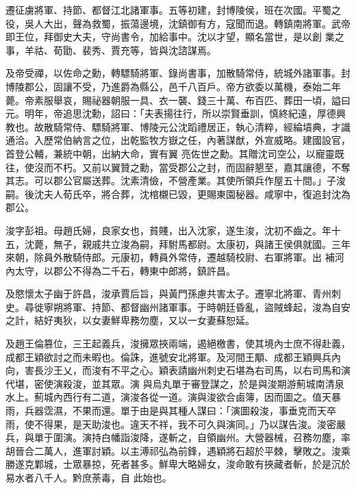 \begin{pinyinscope}
 遷征虜將軍、持節、都督江北諸軍事。五等初建，封博陵侯，班在次國。平蜀之役，吳人大出，聲為救蜀，振蕩邊境，沈鎮御有方，寇聞而退。轉鎮南將軍。武帝即王位，拜御史大夫，守尚書令，加給事中。沈以才望，顯名當世，是以創
 業之事，羊祜、荀勖、裴秀、賈充等，皆與沈諮謀焉。



 及帝受禪，以佐命之勳，轉驃騎將軍、錄尚書事，加散騎常侍，統城外諸軍事。封博陵郡公，固讓不受，乃進爵為縣公，邑千八百戶。帝方欲委以萬機，泰始二年薨。帝素服舉哀，賜祕器朝服一具、衣一襲、錢三十萬、布百匹、葬田一頃，謚曰元。明年，帝追思沈勳，詔曰：「夫表揚往行，所以崇賢垂訓，慎終紀遠，厚德興教也。故散騎常侍、驃騎將軍、博陵元公沈蹈禮居正，執心清粹，經綸墳典，才識通洽。入歷常伯納言之位，出乾監牧方嶽之任，內著謀猷，外宣威略。建國設官，首登公輔，兼統中朝，出納大命，實有翼
 亮佐世之勳。其贈沈司空公，以寵靈既往，使沒而不朽。又前以翼贊之勳，當受郡公之封，而固辭懇至，嘉其讓德，不奪其志。可以郡公官屬送葬。沈素清儉，不營產業。其使所領兵作屋五十間。」子浚嗣。後沈夫人荀氏卒，將合葬，沈棺櫬已毀，更賜東園秘器。咸寧中，復追封沈為郡公。



 浚字彭祖。母趙氏婦，良家女也，貧賤，出入沈家，遂生浚，沈初不齒之。年十五，沈薨，無子，親戚共立浚為嗣，拜駙馬都尉。太康初，與諸王侯俱就國。三年來朝，除員外散騎侍郎。元康初，轉員外常侍，遷越騎校尉、右軍將軍。出
 補河內太守，以郡公不得為二千石，轉東中郎將，鎮許昌。



 及愍懷太子幽于許昌，浚承賈后旨，與黃門孫慮共害太子。遷寧北將軍、青州刺史。尋徙寧朔將軍、持節、都督幽州諸軍事。于時朝廷昏亂，盜賊蜂起，浚為自安之計，結好夷狄，以女妻鮮卑務勿塵，又以一女妻蘇恕延。



 及趙王倫篡位，三王起義兵，浚擁眾挾兩端，遏絕檄書，使其境內士庶不得赴義，成都王穎欲討之而未暇也。倫誅，進號安北將軍。及河間王顒、成都王穎興兵內向，害長沙王乂，而浚有不平之心。穎表請幽州刺史石堪為右司馬，以右司馬和演代堪，密使演殺浚，並其眾。演
 與烏丸單于審登謀之，於是與浚期游薊城南清泉水上。薊城內西行有二道，演浚各從一道。演與浚欲合鹵簿，因而圖之。值天暴雨，兵器霑濕，不果而還。單于由是與其種人謀曰：「演圖殺浚，事垂克而天卒雨，使不得果，是天助浚也。違天不祥，我不可久與演同。」乃以謀告浚。浚密嚴兵，與單于圍演。演持白幡詣浚降，遂斬之，自領幽州。大營器械，召務勿塵，率胡晉合二萬人，進軍討穎。以主溥祁弘為前鋒，遇穎將石超於平棘，擊敗之。浚乘勝遂克鄴城，士眾暴掠，死者甚多。鮮卑大略婦女，浚命敢有挾藏者斬，於是沉於易水者八千人。黔庶荼毒，自
 此始也。




\end{pinyinscope}
